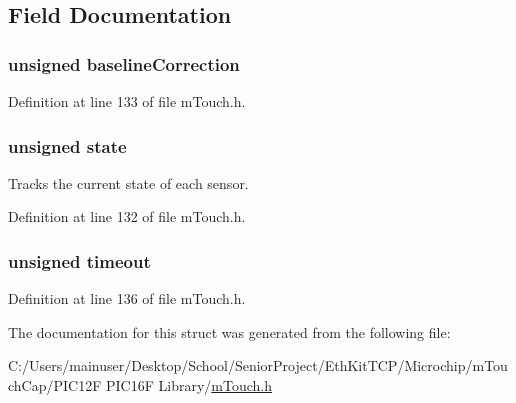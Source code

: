 \subsection{Field Documentation}
\hypertarget{structm_touch___sensor_variables_addc3f92f67ed014b0b847f9de3a50532}{}
\subsubsection[{baseline\+Correction}]{\setlength{\rightskip}{0pt plus 5cm}unsigned baseline\+Correction}\label{structm_touch___sensor_variables_addc3f92f67ed014b0b847f9de3a50532}


Definition at line 133 of file m\+Touch.\+h.

\hypertarget{structm_touch___sensor_variables_a2ae520db1099ff9c7da192764d4e4790}{}
\subsubsection[{state}]{\setlength{\rightskip}{0pt plus 5cm}unsigned state}\label{structm_touch___sensor_variables_a2ae520db1099ff9c7da192764d4e4790}


Tracks the current state of each sensor. 



Definition at line 132 of file m\+Touch.\+h.

\hypertarget{structm_touch___sensor_variables_a7bd15b1b4bbdd7329986c9c4af33d10d}{}
\subsubsection[{timeout}]{\setlength{\rightskip}{0pt plus 5cm}unsigned timeout}\label{structm_touch___sensor_variables_a7bd15b1b4bbdd7329986c9c4af33d10d}


Definition at line 136 of file m\+Touch.\+h.



The documentation for this struct was generated from the following file\+:\begin{DoxyCompactItemize}
\item 
C\+:/\+Users/mainuser/\+Desktop/\+School/\+Senior\+Project/\+Eth\+Kit\+T\+C\+P/\+Microchip/m\+Touch\+Cap/\+P\+I\+C12\+F P\+I\+C16\+F Library/\hyperlink{m_touch_cap_2_p_i_c12_f_01_p_i_c16_f_01_library_2m_touch_8h}{m\+Touch.\+h}\end{DoxyCompactItemize}
